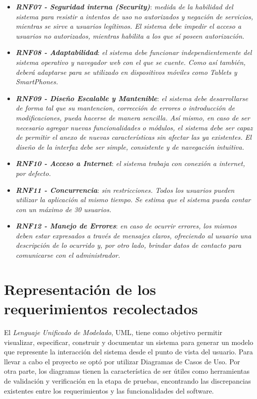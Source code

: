 \documentclass[11pt,oneside]{book}
\begin{document}
\begin{itemize}
\item \textit{\textbf{RNF07 - Seguridad interna (Security)}}: \textit{medida de la habilidad del sistema para resistir a intentos de uso no autorizados y negación de servicios, mientras se sirve a usuarios legítimos. El sistema debe impedir el acceso a usuarios no autorizados, mientras habilita a los que sí poseen autorización.} %

\item \textit{\textbf{RNF08 - Adaptabilidad}}: \textit{el sistema debe funcionar independientemente del sistema operativo y navegador web con el que se cuente. Como así también, deberá adaptarse para se utilizado en dispositivos móviles como Tablets y SmartPhones.}

\item \textit{\textbf{RNF09 - Diseño Escalable y Mantenible}}: \textit{el sistema debe desarrollarse de forma tal que su mantencion, corrección de errores o introducción de modificaciones, pueda hacerse de manera sencilla. Así mismo, en caso de ser necesario agregar nuevas funcionalidades o módulos, el sistema debe ser capaz de permitir el anexo de nuevas características sin afectar las ya existentes. El diseño de la interfaz debe ser simple, consistente y de navegación intuitiva.}

\item \textit{\textbf{RNF10 - Acceso a Internet}}: \textit{el sistema trabaja con conexión a internet, por defecto.}

\item \textit{\textbf{RNF11 - Concurrencia}}: \textit{sin restricciones. Todos los usuarios pueden utilizar la aplicación al mismo tiempo. Se estima que el sistema pueda contar con un máximo de 30 usuarios.}

\item \textit{\textbf{RNF12 - Manejo de Errores}}: \textit{en caso de ocurrir errores, los mismos deben estar expresados a través de mensajes claros, ofreciendo al usuario una descripción de lo ocurrido y, por otro lado, brindar datos de contacto para comunicarse con el administrador.}
\end{itemize}

\section{Representación de los requerimientos recolectados}
El \textit{Lenguaje Unificado de Modelado}, UML, tiene como objetivo permitir visualizar, especificar, construir y documentar un sistema para generar un modelo que represente la interacción del sistema desde el punto de vista del usuario. Para llevar a cabo el proyecto se optó por utilizar Diagramas de Casos de Uso. Por otra parte, los diagramas tienen la característica de ser útiles como herramientas de validación y verificación en la etapa de pruebas, encontrando las discrepancias existentes entre los requerimientos y las funcionalidades del software.
\end{document}
